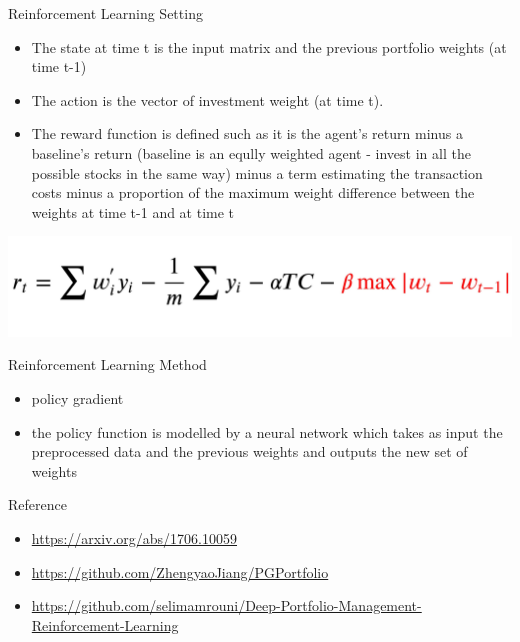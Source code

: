 \documentclass[10pt]{beamer}
\begin{document}
\begin{frame}{Reinforcement Learning Setting}
\begin{itemize}
    \item The state at time t is the input matrix and the previous portfolio weights (at time t-1)
    \item The action is the vector of investment weight (at time t).
    \item The reward function is defined such as it is the agent's return minus a baseline’s return (baseline is an eqully weighted agent - invest in all the possible stocks in the same way) minus a term estimating the transaction costs minus a proportion of the maximum weight difference between the weights at time t-1 and at time t
\end{itemize}
\includegraphics[width=\textwidth]{Presentation/r_tt.jpg}
    
\end{frame}

\begin{frame}{Reinforcement Learning Method}
\begin{itemize}
    \item policy gradient 
    \item the policy function is modelled by a neural network which takes as input the preprocessed data and the previous weights and outputs the new set of weights
\end{itemize}

\end{frame}

\begin{frame}{Reference}
\begin{itemize}
    \item \href{url}{https://arxiv.org/abs/1706.10059}
    \item \href{url}{https://github.com/ZhengyaoJiang/PGPortfolio}
    \item \href{url}{https://github.com/selimamrouni/Deep-Portfolio-Management-Reinforcement-Learning}
\end{itemize}
    
\end{frame}
\end{document}

